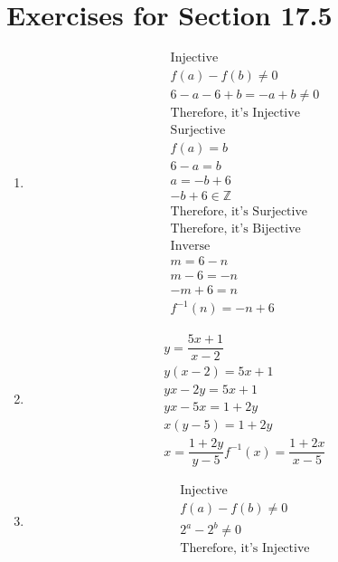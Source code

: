 \documentclass[12pt]{article}
\begin{document}
\section*{Exercises for Section 17.5}
\begin{enumerate}
	\item 
	    \begin{equation*}
	    	\begin{split}
		    \text{Injective}\\
		    f(a) - f(b) \neq 0\\
		    6-a - 6+b = -a+b \neq 0\\
		    \text{Therefore, it's Injective}\\
		    \text{Surjective}\\
		    f(a) = b\\
		    6-a = b\\
		    a = -b+6\\
		    -b+6 \in \mathbb{Z}\\
		    \text{Therefore, it's Surjective}\\
		    \text{Therefore, it's Bijective}\\
		    \text{Inverse}\\
		    m = 6-n\\
		    m-6 = -n\\
		    -m+6 = n\\
		    f^{-1}(n) = -n+6 
	    	\end{split}
	    \end{equation*}
	\item 
	    \begin{equation*}
	    	\begin{split}
		    y = \dfrac{5x+1}{x-2}\\
		    y(x-2) = 5x+1\\
		    yx-2y = 5x+1\\
		    yx-5x = 1+2y\\
		    x(y-5) = 1+2y\\
		    x = \dfrac{1+2y}{y-5}
		    f^{-1}(x) = \dfrac{1+2x}{x-5}
	    	\end{split}
	    \end{equation*}
	\item 
	    \begin{equation*}
	    	\begin{split}
		    \text{Injective}\\
		    f(a) - f(b) \neq 0\\
		    2^a - 2^b \neq 0\\
		    \text{Therefore, it's Injective}\\

\end{split}
\end{equation*}
\end{enumerate}
\end{document}
